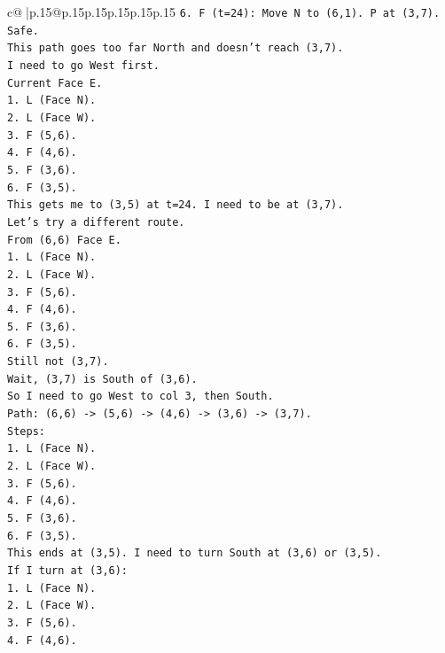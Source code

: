 \documentclass{article}
\begin{document}
{\begin{supertabular}{c@{$\;$}|p{.15\linewidth}@{}p{.15\linewidth}p{.15\linewidth}p{.15\linewidth}p{.15\linewidth}p{.15\linewidth}}
{{{\texttt{6. F (t=24): Move N to (6,1). P at (3,7). Safe.} \\
\texttt{This path goes too far North and doesn't reach (3,7).} \\
\texttt{I need to go West first.} \\
\texttt{Current Face E.} \\
\texttt{1. L (Face N).} \\
\texttt{2. L (Face W).} \\
\texttt{3. F (5,6).} \\
\texttt{4. F (4,6).} \\
\texttt{5. F (3,6).} \\
\texttt{6. F (3,5).} \\
\texttt{This gets me to (3,5) at t=24. I need to be at (3,7).} \\
\texttt{Let's try a different route.} \\
\texttt{From (6,6) Face E.} \\
\texttt{1. L (Face N).} \\
\texttt{2. L (Face W).} \\
\texttt{3. F (5,6).} \\
\texttt{4. F (4,6).} \\
\texttt{5. F (3,6).} \\
\texttt{6. F (3,5).} \\
\texttt{Still not (3,7).} \\
\texttt{Wait, (3,7) is South of (3,6).} \\
\texttt{So I need to go West to col 3, then South.} \\
\texttt{Path: (6,6) {-}> (5,6) {-}> (4,6) {-}> (3,6) {-}> (3,7).} \\
\texttt{Steps:} \\
\texttt{1. L (Face N).} \\
\texttt{2. L (Face W).} \\
\texttt{3. F (5,6).} \\
\texttt{4. F (4,6).} \\
\texttt{5. F (3,6).} \\
\texttt{6. F (3,5).} \\
\texttt{This ends at (3,5). I need to turn South at (3,6) or (3,5).} \\
\texttt{If I turn at (3,6):} \\
\texttt{1. L (Face N).} \\
\texttt{2. L (Face W).} \\
\texttt{3. F (5,6).} \\
\texttt{4. F (4,6).} \\
}}}
\end{supertabular}}
\end{document}
